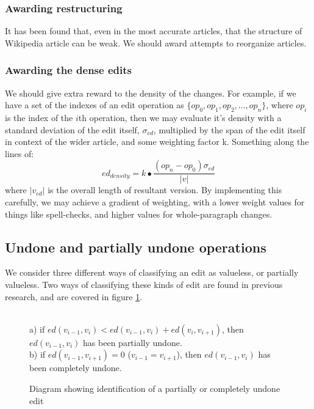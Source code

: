 \documentclass[a4paper,11pt,twoside,notitlepage]{article}
\begin{document}
        \subsubsection*{Awarding restructuring}
        \label{restructuring}
        It has been found that, even in the most accurate articles,
        that the structure of Wikipedia article can be
        weak.\cite{Giles2005} We should award attempts to reorganize
        articles.
        
        \subsubsection*{Awarding the dense edits}
        We should give extra reward to the density of the
        changes. For example, if we have a set of the indexes of an
        edit operation as $\{op_0,op_1,op_2,\dots, op_n\}$, where
        $op_i$ is the index of the $i$th operation, then we may
        evaluate it's density with a standard deviation of the edit
        itself, $\sigma_{ed}$, multiplied by the span of the edit
        itself in context of the wider article, and some weighting
        factor k. Something along the lines of:
        $$ed_{density} = k\bullet\frac{(op_n - op_0)\sigma_{ed}}{|v|}$$ 
        where $|v_{ed}|$ is the overall length of resultant version. By
        implementing this carefully, we may achieve a gradient of
        weighting, with a lower weight values for things like
        spell-checks, and higher values for whole-paragraph changes.

        \subsection*{Undone and partially undone operations}
        We consider three different ways of classifying an edit as
        valueless, or partially valueless. Two ways of classifying
        these kinds of edit are found in previous research, and are
        covered in figure \ref{fig:undo}.

        \begin{figure}[h]
          \centering
          \\
          a) if $ed(v_{i-1},v_i) < ed(v_{i-1},v_i) +
          ed(v_{i},v_{i+1})$, then $ed(v_{i-1},v_i)$ has been
          partially undone.\\ b) if $ed(v_{i-1},v_{i+1}) = 0$
          ($v_{i-1} = v_{i+1}$), then $ed(v_{i-1},v_i)$ has been
          completely undone.
          \caption{Diagram showing identification of a partially or
            completely undone edit}
          \label{fig:undo}
        \end{figure}
\end{document}
